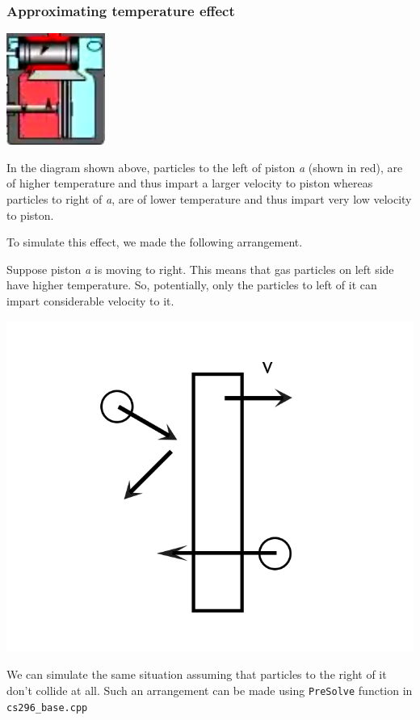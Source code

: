 \documentclass[11pt]{article}
\begin{document}
\subsubsection*{Approximating temperature effect}
\centerline{\includegraphics{temperature.png}}
In the diagram shown above, particles to the left of piston {\it a} (shown in red), are of higher temperature and thus impart a larger velocity to piston whereas particles to right of {\it a}, are of lower temperature and thus impart very low velocity to piston.

To simulate this effect, we made the following arrangement.

Suppose piston {\it a} is moving to right. This means that gas particles on left side have higher temperature. So, potentially, only the particles to left of it can impart considerable velocity to it. 

\centerline{\includegraphics[scale = 0.2]{collision.png}} 

We can simulate the same situation assuming that particles to the right of it don't collide at all. Such an arrangement can be made using {\tt PreSolve} function in {\tt cs296\_base.cpp}\cite{OneSidedPlatform.h}
\end{document}

